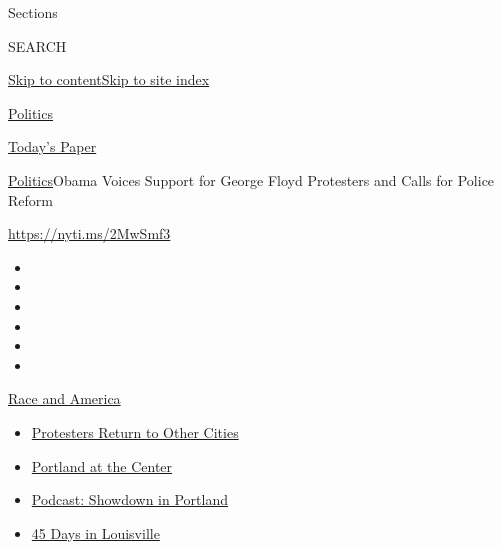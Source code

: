 Sections

SEARCH

\protect\hyperlink{site-content}{Skip to
content}\protect\hyperlink{site-index}{Skip to site index}

\href{https://www.nytimes.com/section/politics}{Politics}

\href{https://myaccount.nytimes.com/auth/login?response_type=cookie\&client_id=vi}{}

\href{https://www.nytimes.com/section/todayspaper}{Today's Paper}

\href{/section/politics}{Politics}\textbar{}Obama Voices Support for
George Floyd Protesters and Calls for Police Reform

\url{https://nyti.ms/2MwSmf3}

\begin{itemize}
\item
\item
\item
\item
\item
\item
\end{itemize}

\href{https://www.nytimes.com/news-event/george-floyd-protests-minneapolis-new-york-los-angeles?action=click\&pgtype=Article\&state=default\&region=TOP_BANNER\&context=storylines_menu}{Race
and America}

\begin{itemize}
\tightlist
\item
  \href{https://www.nytimes.com/2020/07/26/us/protests-portland-seattle-trump.html?action=click\&pgtype=Article\&state=default\&region=TOP_BANNER\&context=storylines_menu}{Protesters
  Return to Other Cities}
\item
  \href{https://www.nytimes.com/2020/07/24/us/portland-oregon-protests-white-race.html?action=click\&pgtype=Article\&state=default\&region=TOP_BANNER\&context=storylines_menu}{Portland
  at the Center}
\item
  \href{https://www.nytimes.com/2020/07/23/podcasts/the-daily/portland-protests.html?action=click\&pgtype=Article\&state=default\&region=TOP_BANNER\&context=storylines_menu}{Podcast:
  Showdown in Portland}
\item
  \href{https://www.nytimes.com/interactive/2020/07/16/us/black-lives-matter-protests-louisville-breonna-taylor.html?action=click\&pgtype=Article\&state=default\&region=TOP_BANNER\&context=storylines_menu}{45
  Days in Louisville}
\end{itemize}


